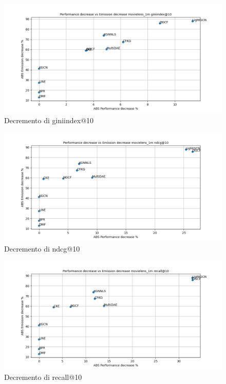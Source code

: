 \begin{figure}[H]
    \centering
    \includegraphics[scale=0.5]{images/decrement_giniindex@10_movielens_1m_40_7.png}
    \caption{Decremento di giniindex@10}
\end{figure}

\begin{figure}[H]
    \centering
    \includegraphics[scale=0.5]{images/decrement_ndcg@10_movielens_1m_40_7.png}
    \caption{Decremento di ndcg@10}
\end{figure}

\begin{figure}[H]
    \centering
    \includegraphics[scale=0.5]{images/decrement_recall@10_movielens_1m_40_7.png}
    \caption{Decremento di recall@10}
\end{figure}

